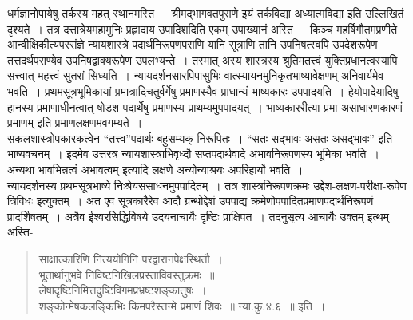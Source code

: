 {धर्मज्ञानोपायेषु तर्कस्य महत् स्थानमस्ति~। श्रीमद्भागवतपुराणे इयं तर्कविद्या अध्यात्म\-विद्या इति उल्लिखितं दृश्यते~। तत्र दत्तात्रेयमहामुनिः प्रह्लादाय उपादिशदिति एकम् उपाख्यानं अस्ति~। किञ्च महर्षिगौतमप्रणीते आन्वीक्षिकीत्यपरसंज्ञे न्यायशास्त्रे पदार्थनिरूपणपराणि यानि सूत्राणि तानि उपनिषत्स्वपि उपदेशरूपेण तत्तदर्थपराण्येव उपनिषद्वाक्यरूपेण उपलभ्यन्ते~। तस्मात् अस्य शास्त्रस्य श्रुतिमतत्त्वं युक्तिप्रधानत्वस्यापि सत्त्वात् महत्त्वं सुतरां सिध्यति~।                      न्यायदर्शनसारपिपासुभिः वात्स्यायनमुनिकृतभाष्यावेक्षणम् अनिवार्यमेव भवति~। प्रथमसूत्रभूमिकायां प्रमात्रादिचतुर्वर्गेषु प्रमाणस्यैव प्राधान्यं भाष्यकारः उपपादयति~। हेयोपादेयादिषु हानस्य प्रमाणाधीनत्वात् षोडश पदार्थेषु प्रमाणस्य प्राथम्यमुपपादयत्~। भाष्यकाररीत्या प्रमा-असाधारणकारणं प्रमाणम् इति प्रमाणलक्षणमवगम्यते~। 
~\\[0.2cm]
सकलशास्त्रोपकारकत्वेन “तत्त्व”पदार्थः बहुसम्यक् निरूपितः~। “सतः सद्भावः असतः असद्भावः” इति भाष्यवचनम्~। इदमेव उत्तरत्र न्यायशास्त्राभिवृध्दौ सप्तपदार्थवादे अभावनिरूपणस्य भूमिका भवति~। अन्यथा भावभिन्नत्वं अभावत्वम् इत्यादि लक्षणे अन्योन्याश्रयः अपरिहार्यो भवति~। 
~\\[0.2cm]
न्यायदर्शनस्य प्रथमसूत्रभाष्ये निःश्रेयससाधनमुपपादितम्~। तत्र शास्त्रनिरूपणक्रमः उद्देश-लक्षण-परीक्षा-रूपेण त्रिविधः इत्युक्तम्~। अत एव सूत्रकारैरेव आदौ ग्रन्थोद्देशं उपपाद्य क्रमेणोपपादितप्रमाणपदार्थनिरूपणं प्रादर्शिषतम्~। अत्रैव ईश्वरसिद्धिविषये उदयनाचार्यैः दृष्टिः प्राक्षिपत~। तदनुसृत्य आचार्यैः उक्तम् इत्थम् अस्ति-
\newpage

\begin{verse}
साक्षात्कारिणि नित्ययोगिनि परद्वारानपेक्षस्थितौ~। \\
भूतार्थानुभवे निविष्टनिखिलप्रस्ताविवस्तुक्रमः~॥\\
लेषादृष्टिनिमित्तदुष्टिविगमप्रभ्रष्टशङ्कातुषः~। \\
शङ्कोन्मेषकलङ्किभिः किमपरैस्तन्मे प्रमाणं शिवः~॥ न्या.कु.४.६~॥ इति~। 
\end{verse}

}
